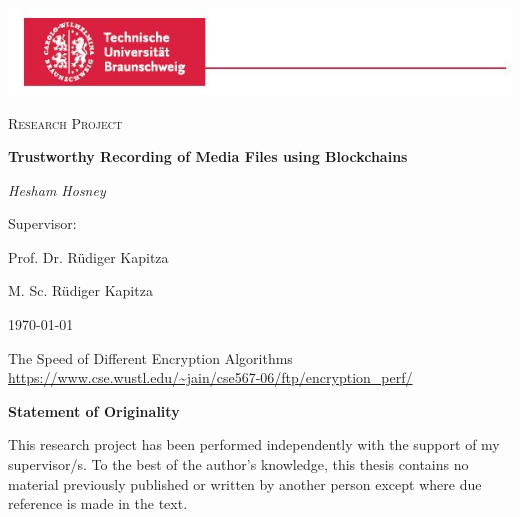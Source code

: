 \documentclass{report}
\begin{document}
\begin{titlepage}
	\centering
	\includegraphics[width=\paperwidth]{images/logo.jpg}\par\vspace{1cm}
	{\scshape\LARGE  \par}
	\vspace{1cm}
	{\scshape\Large Research Project\par}
	\vspace{1.5cm}
	{\huge\bfseries Trustworthy Recording of Media Files using Blockchains \par}
	\vspace{1cm}
	{\huge\itshape Hesham Hosney\par}
        \vspace{2cm} 
	{\Large Supervisor:\par } 
	{\huge Prof. Dr. Rüdiger Kapitza\par}
        \vspace{.5cm} 
        {\huge M. Sc. Rüdiger Kapitza}
	\vfill
	{\large \today\par}
\end{titlepage}


\cleardoublepage

\tableofcontents

\cleardoublepage







\cleardoublepage
\listoffigures
\begin{thebibliography}{9}

The Speed of Different Encryption Algorithms
\url{https://www.cse.wustl.edu/~jain/cse567-06/ftp/encryption_perf/}
\appendix
\end{thebibliography}
\cleardoublepage
\centerline{\bfseries Statement of Originality}
	\vspace*{1em}
	\noindent
	This research project has been performed independently with the support of my supervisor/s.
	To the best of the author's knowledge, this thesis contains no material previously
	published or written by another person except where due reference is made in the text.
\end{document}
